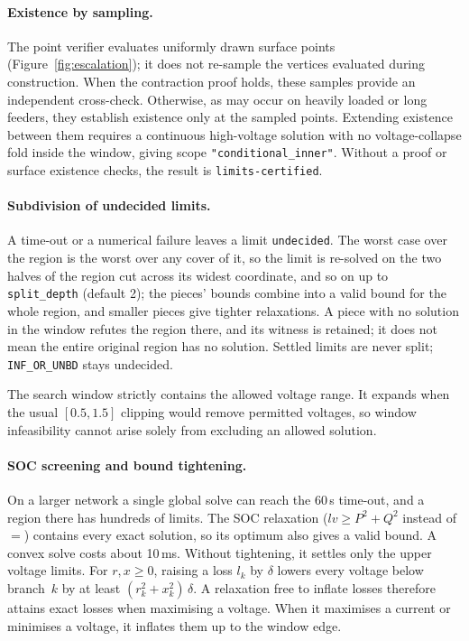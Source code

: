 \documentclass[11pt,a4paper]{report}
\newcommand{\code}[1]{\texttt{\small #1}}
\begin{document}
\paragraph{Existence by sampling.} The point verifier evaluates uniformly
drawn surface points (Figure~\ref{fig:escalation}); it does not re-sample the
vertices evaluated during construction. When the contraction proof holds,
these samples provide an independent cross-check. Otherwise, as may occur on
heavily loaded or long feeders, they establish existence only at the sampled
points. Extending existence between them requires a continuous high-voltage
solution with no voltage-collapse fold inside the window, giving scope
\code{"conditional\_inner"}. Without a proof or surface existence checks,
the result is \code{limits-certified}.

\paragraph{Subdivision of undecided limits.} A time-out or a numerical failure leaves
a limit \code{undecided}. The worst case over the region is the worst over any
cover of it, so the limit is re-solved on the two halves of the region cut across
its widest coordinate, and so on up to \code{split\_depth} (default 2); the pieces'
bounds combine into a valid bound for the whole region, and smaller pieces give
tighter relaxations. A piece with no solution in the window refutes the region
there, and its witness is retained; it does not mean the entire original
region has no solution. Settled limits are never split;
\code{INF\_OR\_UNBD} stays undecided.

The search window strictly contains the allowed voltage range. It expands
when the usual $[0.5,1.5]$ clipping would remove permitted voltages, so window
infeasibility cannot arise solely from excluding an allowed solution.

\paragraph{SOC screening and bound tightening.}
\label{sec:relax-first}
On a larger network a single global solve
can reach the 60\,s time-out, and a region there has hundreds of limits.
The SOC relaxation ($l v \ge P^2 + Q^2$ instead of $=$) contains every exact
solution, so its optimum also gives a valid bound. A convex solve costs about
10\,ms. Without tightening, it settles only the upper voltage limits. For
$r, x \ge 0$, raising a loss $l_k$ by $\delta$ lowers every voltage below
branch~$k$ by at least $(r_k^2 + x_k^2)\,\delta$. A relaxation free to inflate
losses therefore attains exact losses when maximising a voltage. When it
maximises a current or minimises a voltage, it inflates them up to the window
edge.
\end{document}
